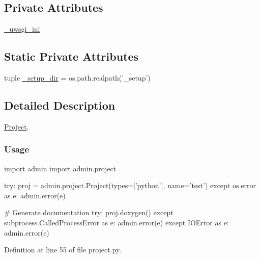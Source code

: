 \subsection*{Private Attributes}
\begin{DoxyCompactItemize}
\item 
\hyperlink{classproject_1_1Project_ae80c6958d6c84acb2d35f8dcafc7e445}{\-\_\-uwsgi\-\_\-ini}
\end{DoxyCompactItemize}
\subsection*{Static Private Attributes}
\begin{DoxyCompactItemize}
\item 
tuple \hyperlink{classproject_1_1Project_a86ab95986a7c432991e1d5a3f7618401}{\-\_\-setup\-\_\-dir} = os.\-path.\-realpath('\-\_\-setup')
\end{DoxyCompactItemize}


\subsection{Detailed Description}
\hyperlink{classproject_1_1Project}{Project}. 

\subsubsection*{Usage}


\begin{DoxyPre}{\ttfamily 
      import admin
      import admin.project}\end{DoxyPre}



\begin{DoxyPre}{\ttfamily       try:
          proj = admin.project.Project(types=['python'], name='test')
      except os.error as e:
          admin.error(e)}\end{DoxyPre}



\begin{DoxyPre}{\ttfamily       \# Generate documentation
      try:
          proj.doxygen()
      except subprocess.CalledProcessError as e:
          admin.error(e)
      except IOError as e:
          admin.error(e)
  }\end{DoxyPre}
 

Definition at line 55 of file project.\-py.



